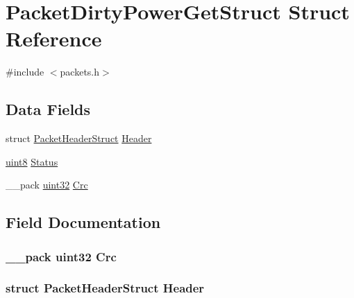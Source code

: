 \hypertarget{struct_packet_dirty_power_get_struct}{}\section{Packet\+Dirty\+Power\+Get\+Struct Struct Reference}
\label{struct_packet_dirty_power_get_struct}


{\ttfamily \#include $<$packets.\+h$>$}

\subsection*{Data Fields}
\begin{DoxyCompactItemize}
\item 
struct \hyperlink{struct_packet_header_struct}{Packet\+Header\+Struct} \hyperlink{struct_packet_dirty_power_get_struct_ab201af50281aff5ed4f984f994938007}{Header}
\item 
\hyperlink{_h_y_d_r_a_s_8_x_2types_8h_a33a5e996e7a90acefb8b1c0bea47e365}{uint8} \hyperlink{struct_packet_dirty_power_get_struct_adf6a0247651b754ec4d7d4982c2914e5}{Status}
\item 
\+\_\+\+\_\+pack \hyperlink{_h_y_d_r_a_s_8_x_2types_8h_acbd4acd0d29e2d6c43104827f77d9cd2}{uint32} \hyperlink{struct_packet_dirty_power_get_struct_a9ac0191cb1217dfb4164ca0e333de3ac}{Crc}
\end{DoxyCompactItemize}


\subsection{Field Documentation}
\hypertarget{struct_packet_dirty_power_get_struct_a9ac0191cb1217dfb4164ca0e333de3ac}{}
\subsubsection[{Crc}]{\setlength{\rightskip}{0pt plus 5cm}\+\_\+\+\_\+pack {\bf uint32} Crc}\label{struct_packet_dirty_power_get_struct_a9ac0191cb1217dfb4164ca0e333de3ac}
\hypertarget{struct_packet_dirty_power_get_struct_ab201af50281aff5ed4f984f994938007}{}
\subsubsection[{Header}]{\setlength{\rightskip}{0pt plus 5cm}struct {\bf Packet\+Header\+Struct} Header}\label{struct_packet_dirty_power_get_struct_ab201af50281aff5ed4f984f994938007}
\hypertarget{struct_packet_dirty_power_get_struct_adf6a0247651b754ec4d7d4982c2914e5}{}
